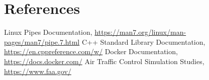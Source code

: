 \documentclass[12pt, onecolumn]{IEEEtran}
\begin{document}
\section{References}
\begin{thebibliography}{9}
     Linux Pipes Documentation, \url{https://man7.org/linux/man-pages/man7/pipe.7.html}
     C++ Standard Library Documentation, \url{https://en.cppreference.com/w/}
     Docker Documentation, \url{https://docs.docker.com/}
     Air Traffic Control Simulation Studies, \url{https://www.faa.gov/}
\end{thebibliography}
\end{document}
